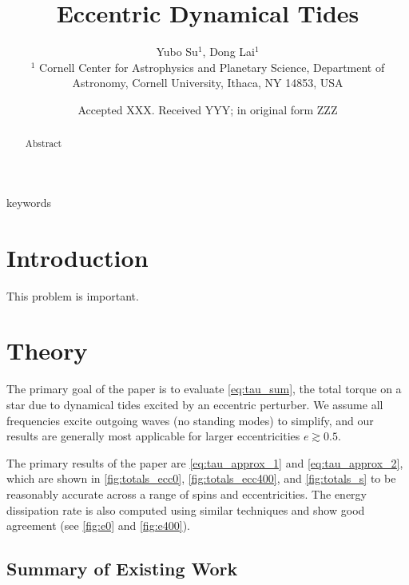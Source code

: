 \documentclass[
        fleqn,
        usenatbib,
        referee,
    ]{mnras}
\title[Eccentric Dynamical Tides]{Eccentric Dynamical Tides}
\author[Y. Su, D. Lai.]{
Yubo Su$^1$,
Dong Lai$^1$
\\
$^1$ Cornell Center for Astrophysics and Planetary Science, Department of
Astronomy, Cornell University, Ithaca, NY 14853, USA
}
\date{Accepted XXX\@. Received YYY\@; in original form ZZZ}
\begin{document}
\label{firstpage}
\pagerange{\pageref{firstpage}--\pageref{lastpage}}
\renewcommand*{\sectionautorefname}{Section}
\maketitle

\begin{abstract}
    Abstract
\end{abstract}

\begin{keywords}
keywords %
\end{keywords}

\section{Introduction}

This problem is important.

\section{Theory}

The primary goal of the paper is to evaluate \autoref{eq:tau_sum}, the total
torque on a star due to dynamical tides excited by an eccentric perturber. We
assume all frequencies excite outgoing waves (no standing modes) to simplify,
and our results are generally most applicable for larger eccentricities $e
\gtrsim 0.5$.

The primary results of the paper are \autoref{eq:tau_approx_1} and
\autoref{eq:tau_approx_2}, which are shown in \autoref{fig:totals_ecc0},
\autoref{fig:totals_ecc400}, and \autoref{fig:totals_s} to be reasonably
accurate across a range of spins and eccentricities. The energy dissipation rate
is also computed using similar techniques and show good agreement (see
\autoref{fig:e0} and \autoref{fig:e400}).

\subsection{Summary of Existing Work}
\end{document}
